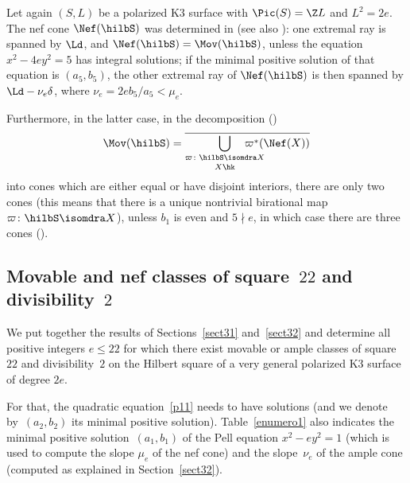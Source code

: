 \label{sect32}

Let again $(S,L)$ be a polarized K3 surface with $\Pic(S)=\Z L$ and $L^2=2e$. The nef cone $\Nef(\hilbS)$ was determined in \cite{bama} (see also \cite[Ex.\,5.3]{dm}): one extremal ray is spanned by $\Ld$, and $\Nef(\hilbS)=\Mov(\hilbS)$, unless the equation $x^2-4ey^2=5$ has integral solutions; if the minimal positive solution of that equation is $(a_5,b_5)$,
the other extremal ray of $\Nef(\hilbS)$ is then spanned by $\Ld-\nu_e\delta$, where $\nu_e=2eb_5/a_5<\mu_e$.

Furthermore, in the latter case, in the decomposition
(\cite[Th.\,7]{hast2})
\begin{equation}\label{chamb}
\Mov(\hilbS)=\overline{\bigcup_{\substack{\varpi\colon \hilbS\isomdra X\\[2pt] X\textnormal{\hk}}}\hspace*{-7mm}\varpi^*(\Nef(X))}
\end{equation}
into cones which are either equal or have disjoint interiors, there are only two cones (this means that there is a unique nontrivial birational map $\varpi\colon \hilbS\isomdra X$), unless
$b_1$ is even and $5\nmid e$, in which case there are three cones (\cite[Ex.\,3.18]{survey}).

\subsection{Movable and nef classes of square~$22$ and divisibility~$2$}\label{sec33}

We put together the results of Sections~\ref{sect31} and~\ref{sect32} and determine all positive integers $e\le 22$ for which there exist movable or ample classes of square~$22$ and divisibility~$2$ on the Hilbert square of a very general polarized K3 surface of degree $2e$.

For that, the quadratic equation~\eqref{p11} needs to have solutions (and we denote by~$(a_2,b_2)$ its minimal positive solution). Table~\ref{enumero1} also indicates the minimal positive solution~$(a_1,b_1)$ of the Pell equation $x^2-ey^2=1$ (which is used to compute the slope $\mu_e$ of the nef cone) and the slope~$\nu_e $ of the ample cone (computed as explained in Section~\ref{sect32}).

